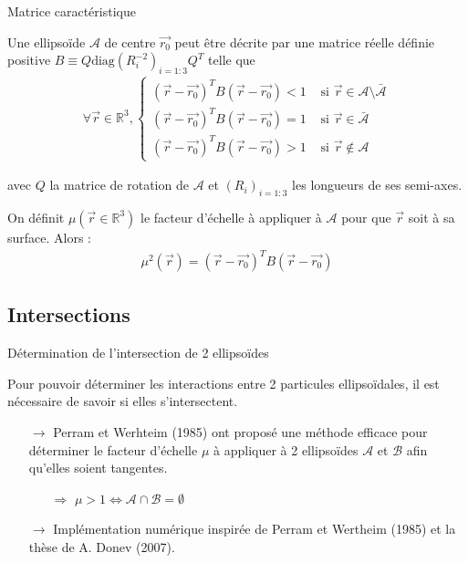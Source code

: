 \documentclass{beamer}
\begin{document}
\begin{frame}{Matrice caractéristique}

\begin{theo}
Une ellipsoïde $\mathcal{A}$ de centre $\vec{r_0}$ peut être décrite par une matrice réelle définie positive $B\equiv Q \text{diag}(R_i^{-2})_{i=1:3} Q^T$ telle que
\vspace{-10pt}
\begin{align*}
\forall \vec{r} \in \mathbb{R}^3, \begin{cases} (\vec{r} - \vec{r_0})^T B (\vec{r} - \vec{r_0}) < 1 &\text{ si } \vec{r} \in \mathcal{A} \setminus \bar{\mathcal{A}} \\ (\vec{r} - \vec{r_0})^T B (\vec{r} - \vec{r_0}) = 1 &\text{ si } \vec{r} \in \bar{\mathcal{A}} \\ (\vec{r} - \vec{r_0})^T B (\vec{r} - \vec{r_0}) > 1 &\text{ si } \vec{r} \notin \mathcal{A} \end{cases}
\end{align*}

\vspace{-10pt}
avec $Q$ la matrice de rotation de $\mathcal{A}$ et $(R_i)_{i=1:3}$ les longueurs de ses semi-axes.
\end{theo}

\begin{theo}
On définit $\mu(\vec{r}\in\mathbb{R}^3)$ le facteur d'échelle à appliquer à $\mathcal{A}$ pour que $\vec{r}$ soit à sa surface. Alors :
\begin{align*}
\mu^2(\vec{r}) = (\vec{r}-\vec{r_0})^TB(\vec{r}-\vec{r_0})
\end{align*}
\end{theo}

\end{frame}

\subsection{Intersections}

\begin{frame}{Détermination de l'intersection de 2 ellipsoïdes}

Pour pouvoir déterminer les interactions entre 2 particules ellipsoïdales, il est nécessaire de savoir si elles s'intersectent.
\begin{itemize}
\item[$\rightarrow$] Perram et Werhteim (1985) ont proposé une méthode efficace pour déterminer le facteur d'échelle $\mu$ à appliquer à 2 ellipsoïdes $\mathcal{A}$ et $\mathcal{B}$ afin qu'elles soient tangentes.
\begin{itemize}
    \item[$\Rightarrow$] $\mu > 1 \Leftrightarrow \mathcal{A}\cap\mathcal{B} = \emptyset$
\end{itemize}
\item[$\rightarrow$] Implémentation numérique inspirée de Perram et Wertheim (1985) et la thèse de A. Donev (2007).
\end{itemize}

\end{frame}
\end{document}
